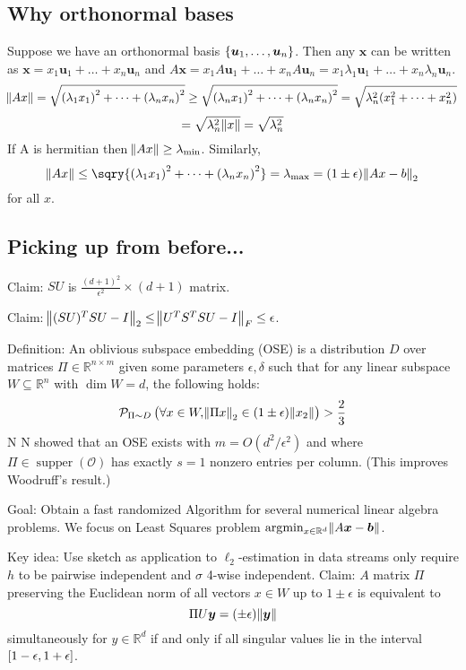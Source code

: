 \documentclass{article}
\newcommand{\RR}{\mathbb{R}}
\begin{document}
\subsection{Why orthonormal bases}
Suppose we have an orthonormal basis \(\set{\bm u_1 , \dots, \bm u_n}\).
Then any \(\bm x\) can be written as \(\bm x = x_1\bm u_1 + \dots + x_n \bm u_n\) and \(A\bm x = x_1A\bm u_1 + \dots + x_n A\bm u_n = x_1\lambda_1\bm u_1 + \dots + x_n \lambda_n\bm u_n\).
\[\norm{Ax} = \sqrt{\del{\lambda_1x_1}^2 + \dots + \del{\lambda_nx_n}^2} \geq \sqrt{\del{\lambda_nx_1}^2 + \dots + \del{\lambda_nx_n}^2}=\sqrt{\lambda_n^2 (x_1^2 + \dots + x_n^2)} \]
\[=\sqrt{\lambda_n^2 \norm{x}} = \sqrt{\lambda_n^2}\]
If  A is hermitian then \(\norm{Ax} \geq \lambda_{\min}\).
Similarly, \[\norm{Ax} \leq \sqry{\del{\lambda_1x_1}^2 + \dots + \del{\lambda_nx_n}^2} = \lambda_{\max} = (1 \pm \epsilon) \norm{Ax - b}_2\]
for all \(x\).

\subsection{Picking up from before...}
Claim: \(SU\) is \(\frac{(d+1)^2}{\epsilon^2}\times(d+1)\) matrix.

Claim: \(\norm{(SU)^TSU - I}_2 \leq \norm{U^TS^TSU - I}_F \leq \epsilon\).

Definition: An oblivious subspace embedding (OSE) is a distribution \(D\) over matrices \(\Pi \in \RR^{n\times m}\) given some parameters \(\epsilon, \delta\) such that for any linear subspace \(W \subseteq \RR^n\) with \(\dim W = d\), the following holds:
\[\mathcal P_{\Pi \sim D}\del{\forall x\in W, \norm{\Pi x}_2 \in (1 \pm \epsilon)\norm{x_2}} > \frac{2}{3}\]
N N showed that an OSE exists with \(m = O(d^2/\epsilon^2)\) and where \(\Pi \in \mathop{\mathrm{supper}}(\mathcal O)\) has exactly \(s = 1\) nonzero entries per column.
(This improves Woodruff's result.)

Goal: Obtain a fast randomized Algorithm for several numerical linear algebra problems.
We focus on Least Squares problem \(\arg\!\min_{x \in \RR^d}\norm{A\bm x - \bm b}\).

Key idea: Use sketch as application to \(\ell_2\)-estimation in data streams only require \(h\) to be pairwise independent and \(\sigma\) 4-wise independent.
Claim: \(A\) matrix \(\Pi\) preserving the Euclidean norm of all vectors \(x \in W\) up to \(1 \pm \epsilon\) is equivalent to
\[\Pi U \bm y = \del{\pm \epsilon} \norm{\bm y}\]
simultaneously for \(y \in \RR^d\) if and only if all singular values lie in the interval \(\intcc{1 - \epsilon, 1+ \epsilon}\).
\end{document}
